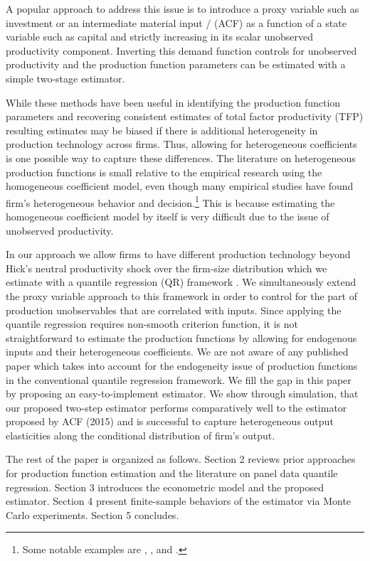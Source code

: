 \documentclass[11pt]{article}
\begin{document}
A popular approach to address this issue is to introduce a proxy variable such as investment \citep{Olley1996} or an intermediate material input \citep{Levinsohn2003} /\citep*{Ackerberg2015} (ACF) as a function of a state variable such as capital and strictly increasing in its scalar unobserved productivity component. Inverting this demand function controls for unobserved productivity and the production function parameters can be estimated with a simple two-stage estimator.

While these methods have been useful in identifying the production function parameters and recovering consistent estimates of total factor productivity (TFP) resulting estimates may be biased if there is additional heterogeneity in production technology across firms. Thus, allowing for heterogeneous coefficients is one possible way to capture these differences. The literature on heterogeneous production functions is small relative to the empirical research using the homogeneous coefficient model, even though many empirical studies have found firm's heterogeneous behavior and decision.\footnote{Some notable examples are \cite*{Kasahara2015}, \cite*{balat}, and \cite*{Li2017}.} This is because estimating the homogeneous coefficient model by itself is very difficult due to the issue of unobserved productivity. 

In our approach we allow firms to have different production technology beyond Hick's neutral productivity shock over the firm-size distribution which we estimate with a quantile regression (QR) framework . We simultaneously extend the proxy variable approach to this framework in order to control for the part of production unobservables that are correlated with inputs. Since applying the quantile regression requires non-smooth criterion function, it is not straightforward to estimate the production functions by allowing for endogenous inputs and their heterogeneous coefficients. We are not aware of any published paper which takes into account for the endogeneity issue of production functions in the conventional quantile regression framework. We fill the gap in this paper by proposing an easy-to-implement estimator.
We show through simulation, that our proposed two-step estimator performs comparatively well to the estimator proposed by ACF (2015) and is successful to capture heterogeneous output elasticities along the conditional distribution of firm's output. 

The rest of the paper is organized as follows. Section 2 reviews prior approaches for production function estimation and the literature on panel data quantile regression. Section 3 introduces the econometric model and the proposed estimator. Section 4 present finite-sample behaviors of the estimator via Monte Carlo experiments. Section 5 concludes.
\end{document}
